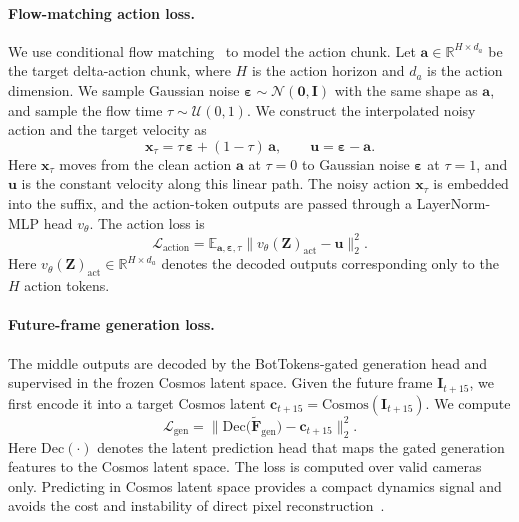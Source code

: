 \documentclass[a4paper,table]{extarticle}
\begin{document}
\paragraph{Flow-matching action loss.}
We use conditional flow matching~\cite{flow_2023,pi0_2026} to model the action chunk. Let $\mathbf a \in \mathbb{R}^{H\times d_a}$ be the target delta-action chunk, where $H$ is the action horizon and $d_a$ is the action dimension. We sample Gaussian noise $\boldsymbol\varepsilon \sim \mathcal N(\mathbf 0,\mathbf I)$ with the same shape as $\mathbf a$, and sample the flow time $\tau\sim\mathcal U(0,1)$. We construct the interpolated noisy action and the target velocity as
\begin{equation}
  \mathbf x_\tau = \tau\,\boldsymbol\varepsilon + (1-\tau)\,\mathbf a,
  \qquad
  \mathbf u = \boldsymbol\varepsilon - \mathbf a .
\end{equation}
Here $\mathbf x_\tau$ moves from the clean action $\mathbf a$ at $\tau=0$ to Gaussian noise $\boldsymbol\varepsilon$ at $\tau=1$, and $\mathbf u$ is the constant velocity along this linear path. The noisy action $\mathbf x_\tau$ is embedded into the suffix, and the action-token outputs are passed through a LayerNorm-MLP head $v_\theta$. The action loss is
\begin{equation}
  \mathcal{L}_{\mathrm{action}}
  = \mathbb{E}_{\mathbf a,\boldsymbol\varepsilon,\tau}
    \big\lVert v_\theta(\mathbf Z)_{\mathrm{act}} - \mathbf u \big\rVert_2^2 .
\end{equation}
Here $v_\theta(\mathbf Z)_{\mathrm{act}}\in\mathbb R^{H\times d_a}$ denotes the decoded outputs corresponding only to the $H$ action tokens.

\paragraph{Future-frame generation loss.}
The middle outputs are decoded by the BotTokens-gated generation head and supervised in the frozen Cosmos latent space. Given the future frame $\mathbf I_{t+15}$, we first encode it into a target Cosmos latent $\mathbf c_{t+15}=\mathrm{Cosmos}(\mathbf I_{t+15})$. We compute
\begin{equation}
  \mathcal{L}_{\mathrm{gen}}
  = \big\lVert \mathrm{Dec}\big(\tilde{\mathbf F}_{\mathrm{gen}}\big)
              - \mathbf c_{t+15}\big\rVert_2^2 .
\end{equation}
Here $\mathrm{Dec}(\cdot)$ denotes the latent prediction head that maps the gated generation features to the Cosmos latent space. The loss is computed over valid cameras only. Predicting in Cosmos latent space provides a compact dynamics signal and avoids the cost and instability of direct pixel reconstruction~\cite{futurevla_2026}.
\end{document}
